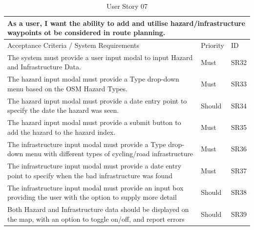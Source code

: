 \begin{table}[!htb]
\caption{User Story 07}
\label{tab:user-story-07}
\begin{tabular}{ p{11cm} p{1cm}  p{1cm} }
\hline
\multicolumn{3}{p{13cm}}{As a user, I want the ability to add and utilise hazard/infrastructure waypoints ot be considered in route planning.}\\ 
\hline
Acceptance Criteria / System Requirements & Priority & ID\\
\hline
The system must provide a user input modal to input Hazard and Infrastructure Data. & Must & SR32 \\
The hazard input modal must provide a Type drop-down menu based on the OSM Hazard Types. & Must & SR33\\
The hazard input modal must provide a date entry point to specify the date the hazard was seen. & Should & SR34\\
The hazard input modal must provide a submit button to add the hazard to the hazard index. & Must & SR35\\
The infrastructure input modal must provide a Type drop-down menu with different types of cycling/road infrastructure & Must & SR36\\
The infrastructure input modal must provide a date entry point to specify when the bad infrastructure was found & Must & SR37\\
The infrastructure input modal must provide an input box providing the user with the option to supply more detail & Should & SR38\\
Both Hazard and Infrastructure data should be displayed on the map, with an option to toggle on/off, and report errors & Should & SR39\\
\hline
\end{tabular}
\end{table}

